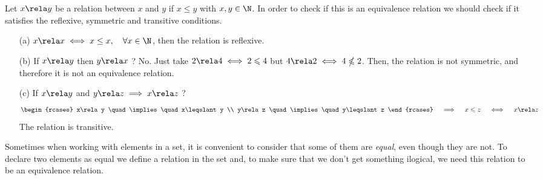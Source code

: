 \begin{example}
    Let $x\rela y$ be a relation between $x$ and $y$ if $x\leq y$ with $x, y\in\N$. In order to check if this is an equivalence relation we should check if it satisfies the reflexive, symmetric and transitive conditions.

    \begin{itemize}
        \item[(a)] $x\rela x \iff x\leq x,\quad\forall x\in\N$, then the relation is reflexive.
        \item[(b)] If $x\rela y$ then $y\rela x$ ? No. Just take $2\rela 4 \iff 2\leqslant 4$ but $4\rela 2 \iff 4\nleqslant 2$. Then, the relation is not symmetric, and therefore it is not an equivalence relation.
        \item[(c)] If $x\rela y$ and $y\rela z \implies x\rela z$ ?
            \begin{equation}
                \begin{rcases}
                    x\rela y \quad\implies\quad x\leqslant y \\
                    y\rela z \quad\implies\quad y\leqslant z
                \end{rcases} \quad\implies\quad x\leqslant z \quad\iff\quad x\rela z
            \end{equation}
            The relation is transitive.
    \end{itemize}
    
\end{example}

Sometimes when working with elements in a set, it is convenient to consider that some of them are \textit{equal}, even though they are not. To declare two elements as equal we define a relation in the set and, to make sure that we don't get something ilogical, we need this relation to be an equivalence relation.

